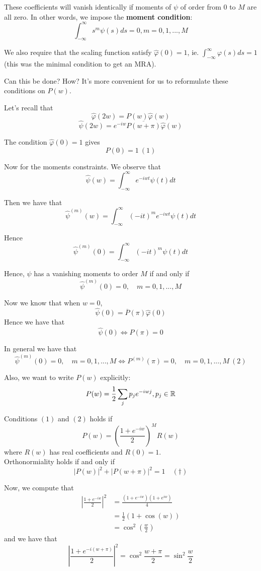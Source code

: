 \documentclass{article}
\begin{document}
{These coefficients will vanish identically if moments of $\psi$ of order from $0$ to $M$ are all zero. In other words, we impose the \textbf{moment condition}:
\[\int_{-\infty}^{\infty} s^m \psi(s) ds = 0, m = 0, 1, ..., M\]

We also require that the scaling function satisfy $\widehat{\varphi}(0) = 1$, ie. $\int_{-\infty}^{\infty} \varphi(s) ds = 1$ (this was the minimal condition to get an MRA).

\begin{question}
    Can this be done? How? It's more convenient for us to reformulate these conditions on $P(w)$. 
\end{question}

Let's recall that
\[\widehat{\varphi}(2w) = P(w)\widehat{\varphi}(w) \]
\[\widehat{\psi}(2w) = e^{-iw} \overline{P(w+\pi)} \widehat{\varphi}(w) \]

The condition $\widehat{\varphi}(0) = 1$ gives
\[P(0) = 1\ (1)\]

Now for the moments constraints. We observe that
\[\widehat{\psi}(w) = \int_{-\infty}^{\infty} e^{-iwt} \psi(t) dt\]

Then we have that
\[\widehat{\psi}^{(m)}(w) = \int_{-\infty}^{\infty} (-it)^m e^{-iwt} \psi(t) dt \]

Hence
\[\widehat{\psi}^{(m)}(0) = \int_{-\infty}^{\infty} (-it)^m \psi(t) dt \]

Hence, $\psi$ has a vanishing moments to order $M$ if and only if
\[\widehat{\psi}^{(m)}(0) = 0,\quad m = 0, 1, ..., M \]

Now we know that when $w = 0$,
\[\widehat{\psi}(0) = \overline{P}(\pi) \widehat{\varphi}(0)\]
Hence we have that
\[\widehat{\psi}(0) \iff P(\pi) = 0\]

In general we have that
\[\widehat{\psi}^{(m)}(0) = 0,\quad m = 0, 1, ..., M \iff P^{(m)}(\pi) = 0, \quad m = 0, 1, ..., M\ (2) \]

Also, we want to write $P(w)$ explicitly:
\[P(w) = \frac{1}{2} \sum_{j} p_j e^{-iwj}, p_j \in \mathbb{R}\]

Conditions $(1)$ and $(2)$ holds if
\[P(w) = (\frac{1 + e^{-iw}}{2})^M R(w)\]
where $R(w)$ has real coefficients and $R(0) = 1$.\\

Orthonormiality holds if and only if
\[|P(w)|^2 + |P(w + \pi)|^2 = 1 \quad (\dagger)\]

Now, we compute that
\begin{align*}
    |\frac{1 + e^{-iw}}{2}|^2 &= \frac{(1 + e^{-iw})(1 + e^{iw})}{4}\\
    &= \frac{1}{2} (1 + \cos(w))\\
    &= \cos^2(\frac{w}{2})
\end{align*}
and we have that
\[|\frac{1 + e^{-i(w+\pi)}}{2}|^2 = \cos^2 \frac{w + \pi}{2} = \sin^2 \frac{w}{2}\]

}
\end{document}
